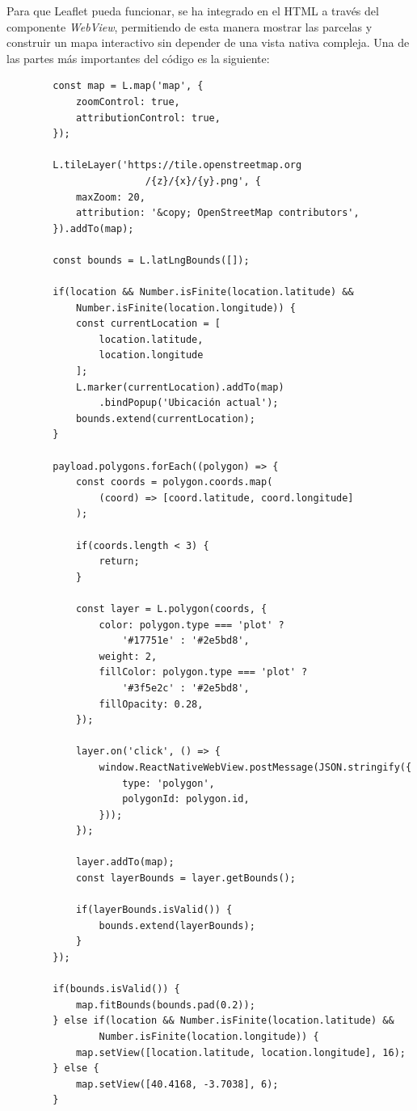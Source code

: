\begin{itemize}
    Para que Leaflet pueda funcionar, se ha integrado en el HTML a través del componente \textit{WebView}, permitiendo de esta manera mostrar las parcelas y construir un mapa interactivo sin depender de una vista nativa compleja. Una de las partes más
    importantes del código es la siguiente:
    
    \begin{verbatim}
        const map = L.map('map', {
            zoomControl: true,
            attributionControl: true,
        });

        L.tileLayer('https://tile.openstreetmap.org
                        /{z}/{x}/{y}.png', {
            maxZoom: 20,
            attribution: '&copy; OpenStreetMap contributors',
        }).addTo(map);

        const bounds = L.latLngBounds([]);

        if(location && Number.isFinite(location.latitude) && 
            Number.isFinite(location.longitude)) {
            const currentLocation = [
                location.latitude, 
                location.longitude
            ];
            L.marker(currentLocation).addTo(map)
                .bindPopup('Ubicación actual');
            bounds.extend(currentLocation);
        }

        payload.polygons.forEach((polygon) => {
            const coords = polygon.coords.map(
                (coord) => [coord.latitude, coord.longitude]
            );

            if(coords.length < 3) {
                return;
            }

            const layer = L.polygon(coords, {
                color: polygon.type === 'plot' ? 
                    '#17751e' : '#2e5bd8',
                weight: 2,
                fillColor: polygon.type === 'plot' ? 
                    '#3f5e2c' : '#2e5bd8',
                fillOpacity: 0.28,
            });

            layer.on('click', () => {
                window.ReactNativeWebView.postMessage(JSON.stringify({
                    type: 'polygon',
                    polygonId: polygon.id,
                }));
            });

            layer.addTo(map);
            const layerBounds = layer.getBounds();

            if(layerBounds.isValid()) {
                bounds.extend(layerBounds);
            }
        });

        if(bounds.isValid()) {
            map.fitBounds(bounds.pad(0.2));
        } else if(location && Number.isFinite(location.latitude) && 
                Number.isFinite(location.longitude)) {
            map.setView([location.latitude, location.longitude], 16);
        } else {
            map.setView([40.4168, -3.7038], 6);
        }
    \end{verbatim}


\end{itemize}
